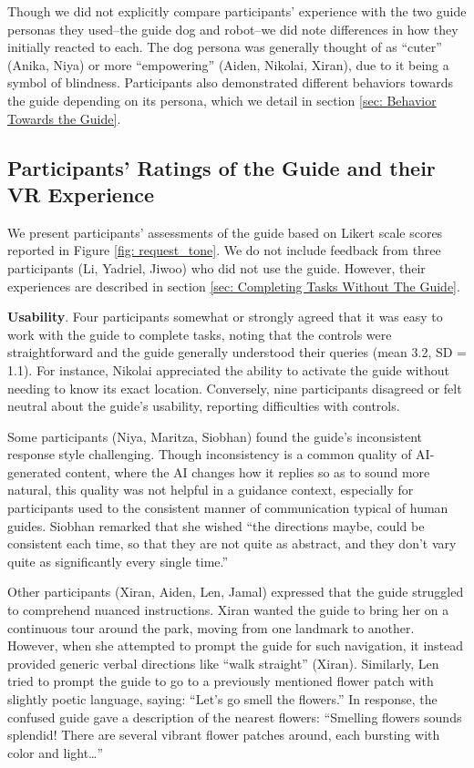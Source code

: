 Though we did not explicitly compare participants’ experience with the two guide personas they used–the guide dog and robot–we did note differences in how they initially reacted to each. The dog persona was generally thought of as “cuter” (Anika, Niya) or more “empowering” (Aiden, Nikolai, Xiran), due to it being a symbol of blindness. Participants also demonstrated different behaviors towards the guide depending on its persona, which we detail in section \ref{sec: Behavior Towards the Guide}.




\subsection{Participants’ Ratings of the Guide and their VR Experience}

We present participants’ assessments of the guide based on Likert scale scores reported in Figure \ref{fig: request_tone}. We do not include feedback from three participants (Li, Yadriel, Jiwoo) who did not use the guide. However, their experiences are described in section \ref{sec: Completing Tasks Without The Guide}.



\textbf{Usability}. Four participants somewhat or strongly agreed that it was easy to work with the guide to complete tasks, noting that the controls were straightforward and the guide generally understood their queries (mean 3.2, SD = 1.1). For instance, Nikolai appreciated the ability to activate the guide without needing to know its exact location. Conversely, nine participants disagreed or felt neutral about the guide’s usability, reporting difficulties with controls.

Some participants (Niya, Maritza, Siobhan) found the guide's inconsistent response style challenging. Though inconsistency is a common quality of AI-generated content, where the AI changes how it replies so as to sound more natural, this quality was not helpful in a guidance context, especially for participants used to the consistent manner of communication typical of human guides. Siobhan remarked that she wished “the directions maybe, could be consistent each time, so that they are not quite as abstract, and they don't vary quite as significantly every single time.”

Other participants (Xiran, Aiden, Len, Jamal) expressed that the guide struggled to comprehend nuanced instructions. Xiran wanted the guide to bring her on a continuous tour around the park, moving from one landmark to another. However, when she attempted to prompt the guide for such navigation, it instead provided generic verbal directions like “walk straight” (Xiran). Similarly, Len tried to prompt the guide to go to a previously mentioned flower patch with slightly poetic language, saying: “Let’s go smell the flowers.” In response, the confused guide gave a description of the nearest flowers: “Smelling flowers sounds splendid! There are several vibrant flower patches around, each bursting with color and light…”

